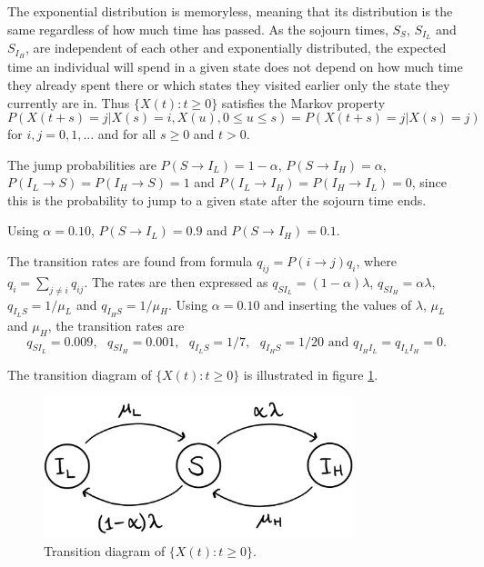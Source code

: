 
The exponential distribution is memoryless, meaning that its distribution is the same regardless of how much time has passed. As the sojourn times, $S_S$, $S_{I_L}$ and $S_{I_H}$, are independent of each other and exponentially distributed, the expected time an individual will spend in a given state does not depend on how much time they already spent there or which states they visited earlier only the state they currently are in. Thus $\{X(t):t \geq 0 \}$  satisfies the Markov property
$$P(X(t+s)=j|X(s)=i, X(u), 0 \leq u \leq s)=P(X(t+s)=j|X(s)=j)$$ 
for $i,j = 0,1,...$ and for all $s \geq 0$ and $t >0 $.

The jump probabilities are $P(S \rightarrow I_L)= 1 - \alpha$, $P(S \rightarrow I_H)= \alpha$, $P(I_L \rightarrow S)= P(I_H \rightarrow S) = 1$ and $P(I_L \rightarrow I_H)= P(I_H \rightarrow I_L) = 0$, since this is the probability to jump to a given state after the sojourn time ends.

Using $\alpha = 0.10$, $P(S \rightarrow I_L)= 0.9$ and $P(S \rightarrow I_H)= 0.1$. 

The transition rates are found from formula $q_{ij} = P(i \rightarrow j ) q_i$, where $q_i = \sum_{j \neq i} q_{ij}$. The rates are then expressed as $q_{SI_L} = (1-\alpha)\lambda $, $q_{SI_H} = \alpha \lambda$, $q_{I_LS} = 1/\mu_L$ and $q_{I_HS} = 1/\mu_H$. Using $\alpha = 0.10$ and inserting the values of $\lambda$, $\mu_L$ and $\mu_H$, the transition rates are 
$$q_{SI_L} = 0.009,\text{ } q_{SI_H} = 0.001, \text{ } q_{I_LS} = 1/7, \text{ } q_{I_HS} = 1/20 \text{ and } q_{I_HI_L}=q_{I_LI_H}=0.$$

The transition diagram of $\{X(t):t \geq 0 \}$ is illustrated in figure \ref{transdiagramA}. 

\begin{figure}
    \centering
    \includegraphics[width=90mm]{TransDiag1A.png}
    \caption{Transition diagram of $\{X(t):t\geq0\}$.}
    \label{transdiagramA}
\end{figure}




